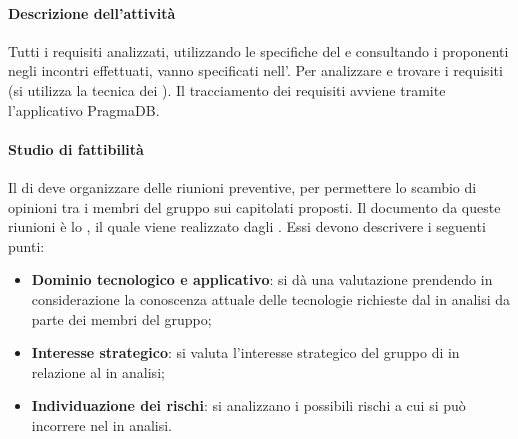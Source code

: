  \paragraph{Descrizione dell'attività}
 Tutti i requisiti analizzati, utilizzando le specifiche del  e consultando i proponenti negli
incontri effettuati, vanno specificati nell'\ARdocRR. Per analizzare e trovare i
requisiti (si utilizza la tecnica dei ). Il tracciamento dei requisiti avviene tramite l'applicativo PragmaDB.
 \paragraph{Studio di fattibilità}
 Il \RESP{} di  deve organizzare delle riunioni preventive, per permettere lo scambio
di opinioni tra i membri del gruppo sui capitolati proposti. Il documento  da queste
riunioni è lo \SFdocRR , il quale viene realizzato dagli \ANP{}. Essi devono
descrivere i seguenti punti: 
\begin{itemize}
 \item \textbf{Dominio tecnologico e applicativo}: si dà una valutazione prendendo in   considerazione
 la conoscenza attuale delle tecnologie richieste dal  in analisi da parte dei membri  
del gruppo;
 \item \textbf{Interesse strategico}: si valuta l'interesse strategico del gruppo di  in relazione
al  in analisi;
 \item \textbf{Individuazione dei rischi}: si analizzano i possibili rischi a cui si può incorrere nel
 in analisi.
\end{itemize}
